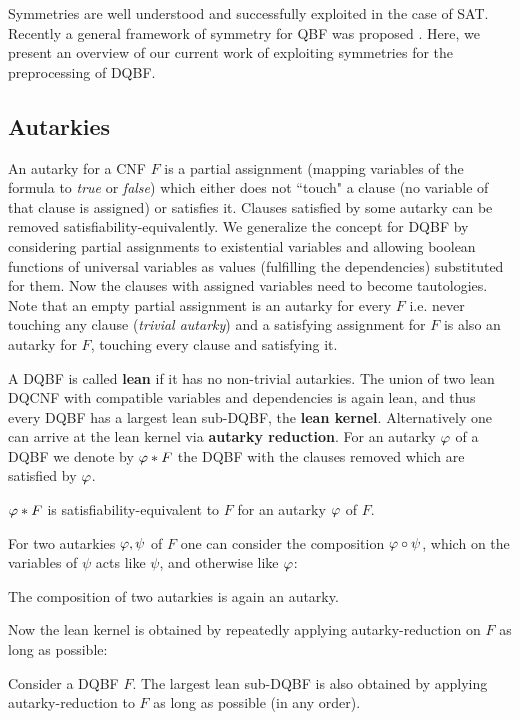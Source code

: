 \documentclass[conference]{IEEEtran}
\begin{document}
Symmetries are well understood and successfully exploited in the case of SAT. 
%
Recently a general framework of symmetry for QBF was proposed \cite{kauers2018symmetries}.
%
Here, we present an overview of our current work of exploiting symmetries for the preprocessing of DQBF.   

\subsection{Autarkies}
\label{sec:aut}
An autarky for a CNF $F$ is a partial assignment (mapping variables of the formula to \textit{true} or \textit{false}) which either does not ``touch" a clause (no variable of that clause is assigned) or satisfies it.
%
Clauses satisfied by some autarky can be removed satisfiability-equivalently. 
%
We generalize the concept for DQBF by considering partial assignments to existential variables and allowing boolean functions of universal variables as values (fulfilling the dependencies) substituted for them.
%
Now the clauses with assigned variables need to become tautologies.
%
Note that an empty partial assignment is an autarky for every $F$ i.e. never touching any clause (\textit{trivial autarky}) and a satisfying assignment for $F$ is also an autarky for $F$, touching every clause and satisfying it.

A DQBF is called \textbf{lean} if it has no non-trivial autarkies.
The union of two lean DQCNF with compatible variables and dependencies is again lean, and thus every DQBF has a largest lean sub-DQBF, the \textbf{lean kernel}.
Alternatively one can arrive at the lean kernel via \textbf{autarky reduction}.
For an autarky $\varphi$ of a DQBF we denote by $\varphi * F$ the DQBF with the clauses removed which are satisfied by $\varphi$.
\begin{lem}\label{lem:autsateq}
	$\varphi * F$ is satisfiability-equivalent to $F$ for an autarky $\varphi$ of $F$.
\end{lem}
For two autarkies $\varphi, \psi$ of $F$ one can consider the composition $\varphi \circ \psi$, which on the variables of $\psi$ acts like $\psi$, and otherwise like $\varphi$:
\begin{lem}\label{lem:compaut}
	The composition of two autarkies is again an autarky.
\end{lem}
Now the lean kernel is obtained by repeatedly applying autarky-reduction on $F$ as long as possible:
\begin{lem}\label{lem:decomp}
	Consider a DQBF $F$. The largest lean sub-DQBF is also obtained by applying autarky-reduction to $F$ as long as possible (in any order).
\end{lem}
\end{document}
